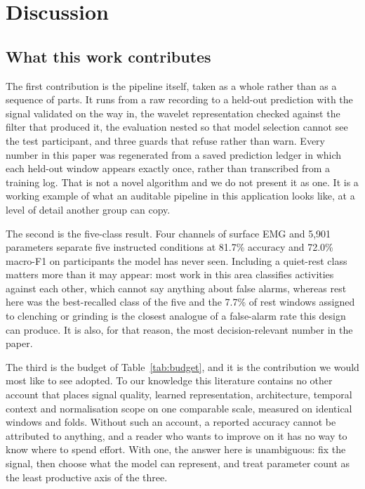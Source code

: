 \documentclass[pdflatex,sn-nature,iicol]{sn-jnl}
\begin{document}
\section{Discussion}

\subsection{What this work contributes}

The first contribution is the pipeline itself, taken as a whole rather than as a sequence of parts. It runs from a raw recording to a held-out prediction with the signal validated on the way in, the wavelet representation checked against the filter that produced it, the evaluation nested so that model selection cannot see the test participant, and three guards that refuse rather than warn. Every number in this paper was regenerated from a saved prediction ledger in which each held-out window appears exactly once, rather than transcribed from a training log. That is not a novel algorithm and we do not present it as one. It is a working example of what an auditable pipeline in this application looks like, at a level of detail another group can copy.

The second is the five-class result. Four channels of surface EMG and 5,901 parameters separate five instructed conditions at 81.7\% accuracy and 72.0\% macro-F1 on participants the model has never seen. Including a quiet-rest class matters more than it may appear: most work in this area classifies activities against each other, which cannot say anything about false alarms, whereas rest here was the best-recalled class of the five and the 7.7\% of rest windows assigned to clenching or grinding is the closest analogue of a false-alarm rate this design can produce. It is also, for that reason, the most decision-relevant number in the paper.

The third is the budget of Table~\ref{tab:budget}, and it is the contribution we would most like to see adopted. To our knowledge this literature contains no other account that places signal quality, learned representation, architecture, temporal context and normalisation scope on one comparable scale, measured on identical windows and folds. Without such an account, a reported accuracy cannot be attributed to anything, and a reader who wants to improve on it has no way to know where to spend effort. With one, the answer here is unambiguous: fix the signal, then choose what the model can represent, and treat parameter count as the least productive axis of the three.
\end{document}
